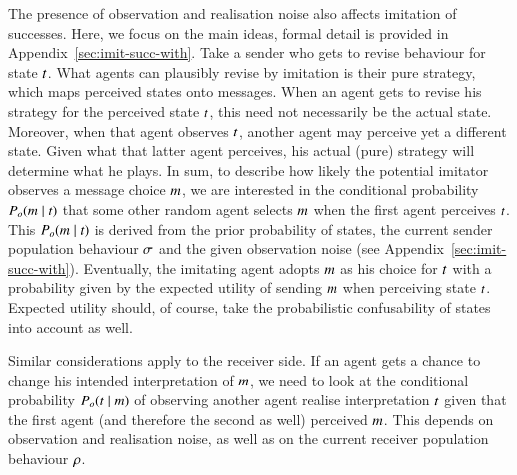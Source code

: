 \documentclass[11pt,english]{article}
\numberwithin{equation}{section}
\begin{document}
The presence of observation and realisation noise also affects imitation of successes. Here, we
focus on the main ideas, formal detail is provided in Appendix~\ref{sec:imit-succ-with}. Take a
sender who gets to revise behaviour for state $t$. What agents can plausibly revise by
imitation is their pure strategy, which maps perceived states onto messages. When an agent gets
to revise his strategy for the perceived state $t$, this need not necessarily be the
actual state. Moreover, when that agent observes $t$, another agent may perceive yet a
different state. Given what that latter agent perceives, his actual (pure) strategy will
determine what he plays. In sum, to describe how likely the potential imitator observes a
message choice $m$, we are interested in the conditional probability
$P_o(m \mid t)$ that some other random agent selects $m$ when the first
agent perceives $t$. This $P_o(m \mid t)$ is derived from the prior
probability of states, the current sender population behaviour $\sigma$ and the given
observation noise (see Appendix~\ref{sec:imit-succ-with}). Eventually, the imitating agent adopts
$m$ as his choice for $t$ with a probability given by the expected utility of sending
$m$ when perceiving state $t$. Expected utility should, of course, take the
probabilistic confusability of states into account as well.

Similar considerations apply to the receiver side. If an agent gets a chance to change his
intended interpretation of $m$, we need to look at the conditional probability
$P_o(t \mid m)$ of observing another agent realise interpretation $t$ given
that the first agent (and therefore the second as well) perceived $m$. This depends on
observation and realisation noise, as well as on the current receiver population behaviour
$\rho$.
\end{document}
